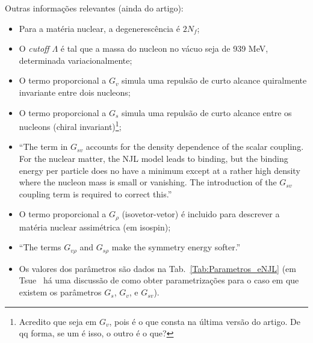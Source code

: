 Outras informações relevantes (ainda do artigo):
\begin{itemize}
	\item Para a matéria nuclear, a degenerescência é $2 N_f$;
	\item O \emph{cutoff} $\Lambda$ é tal que a massa do nucleon no vácuo seja de 939 MeV, determinada variacionalmente;
	\item O termo proporcional a $G_v$ simula uma repulsão de curto alcance quiralmente invariante entre dois nucleons;
	\item O termo proporcional a $G_s$ simula uma repulsão de curto alcance entre os nucleons (chiral invariant)\footnote{Acredito que seja em $G_v$, pois é o que consta na última versão do artigo. De qq forma, se um é isso, o outro é o que?};
	\item ``The term in $G_{sv}$ accounts for the density dependence of the scalar coupling. For the nuclear matter, the NJL model leads to binding, but the binding energy per particle does no have a minimum except at a rather high density where the nucleon mass is small or vanishing. The introduction of the $G_{sv}$ coupling term is required to correct this.''
	\item O termo proporcional a $G_\rho$ (isovetor-vetor) é incluido para descrever a matéria nuclear assimétrica (em isospin);
	\item ``The terms $G_{v\rho}$ and $G_{s\rho}$ make the symmetry energy softer.''
	\item Os valores dos parâmetros são dados na Tab.~\ref{Tab:Parametros_eNJL} (em Tsue~\cite{japoneses} há uma discussão de como obter parametrizações para o caso em que existem os parâmetros $G_s$, $G_v$, e $G_{sv}$).
\end{itemize}

